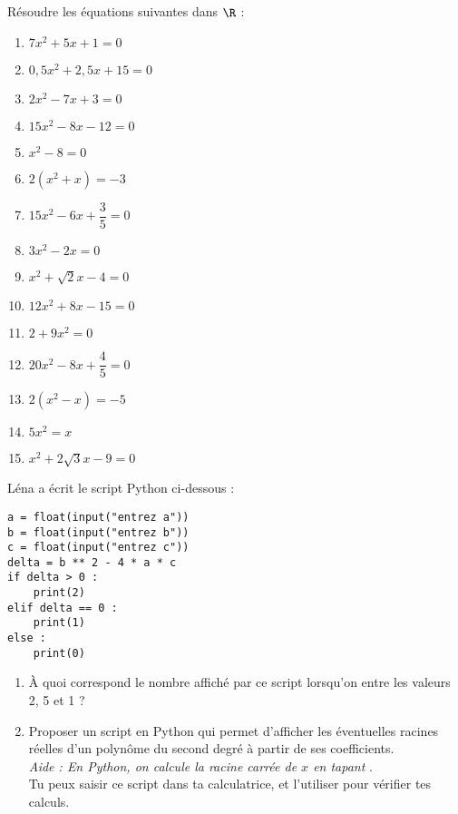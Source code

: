 \documentclass[a4paper,11pt,exos]{nsi} %
\begin{document}
\exo{}
Résoudre les équations suivantes dans $\R$ :
\begin{multicols}{3}
	\begin{enumerate}
		\item 	$7x^2+5x+1=0$
		\item 	$0,5x^2+2,5x+15=0$
		\item 	$2x^2-7x+3=0$
		\item $15 x^{2}-8 x-12=0$
		\item $x^2-8=0$
		\item $2(x^2+x)=-3$
		\item $15x^2-6x+\dfrac{3}{5}=0$
		\item $3x^2-2x=0$
		\item $x^2+\sqrt{2}x-4=0$
		\item $12x^2+8x-15=0$
		\item $2+9x^2=0$
		\item $20x^2-8x+\dfrac{4}{5}=0$
		\item $2(x^2-x)=-5$
		\item $5x^2=x$
		\item $x^2+2\sqrt{3}x-9=0$
	\end{enumerate}
\end{multicols}

\exo{}
Léna a écrit le script Python ci-dessous :
\begin{pyc}
    \begin{verbatim}
a = float(input("entrez a"))
b = float(input("entrez b"))
c = float(input("entrez c"))
delta = b ** 2 - 4 * a * c
if delta > 0 :
    print(2)
elif delta == 0 :
    print(1)
else :
    print(0)        
    \end{verbatim}
\end{pyc}
\begin{enumerate}
	\item 	À quoi correspond le nombre affiché par ce script lorsqu'on entre les valeurs 2, 5 et 1 ?
	\item 	Proposer un script en Python qui permet d'afficher les éventuelles racines réelles d'un polynôme du second degré à partir de ses coefficients.\\
	\textit{Aide : En Python, on calcule la racine carrée de $x$ en tapant }.\\
	Tu peux saisir ce script dans ta calculatrice, et l'utiliser pour vérifier tes calculs.
\end{enumerate}
\end{document}
